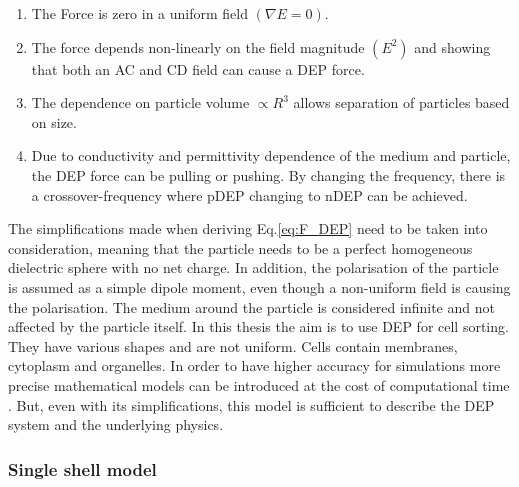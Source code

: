 \documentclass[final]{jyflluk}
\begin{document}
\begin{enumerate}
\renewcommand{\labelenumi}{\Roman{enumi}}  %
    \setlength{\itemsep}{1pt}
    \setlength{\parskip}{1pt}
    \item The Force is zero in a uniform field $(\nabla E=0)$.
    \item The force depends non-linearly on the field magnitude $(E^2)$ and showing that both an AC and CD field can cause a DEP force.
    \item The dependence on particle volume $\propto R^3$ allows separation of particles based on size.
    \item Due to conductivity and permittivity dependence of the medium and particle, the DEP force can be pulling or  pushing. By changing the frequency, there is a crossover-frequency where pDEP changing to nDEP can be achieved. \cite{zhang_dielectrophoresis_2010}
\end{enumerate}
The simplifications made when deriving Eq.\ref{eq:F_DEP} need to be taken into consideration, meaning that the particle needs to be a perfect homogeneous dielectric sphere with no net charge. In addition, the polarisation of the particle is assumed as a simple dipole moment, even though a non-uniform field is causing the polarisation.  The medium around the particle is considered infinite and not affected by the particle itself. \cite{pethig_review_2010} In this thesis the aim is to use DEP for cell sorting. They have various shapes and are not uniform. Cells contain membranes, cytoplasm and organelles. In order to have higher accuracy for simulations more precise mathematical models can be introduced at the cost of computational time \cite{pethig_review_2010, jubery_dielectrophoretic_2014,  cottet_mydep_2019, cetin_dielectrophoresis_2011}. But, even with its simplifications, this model is sufficient to describe the DEP system and the underlying physics.

\subsubsection{Single shell model}
\label{sec:x3.2}
\end{document}

